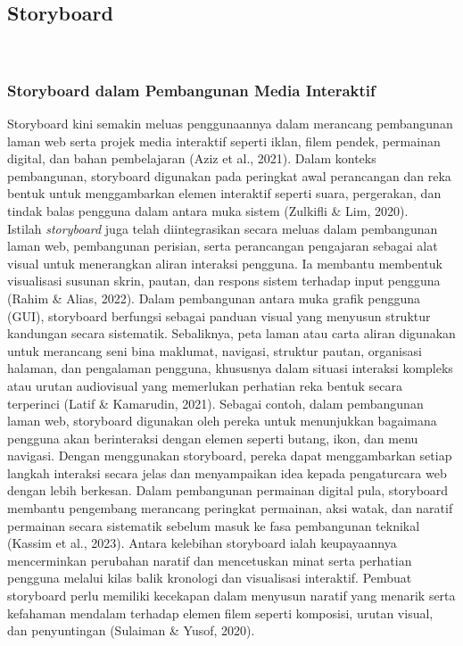 \subsection{Storyboard }\\

\subsubsection{{Storyboard dalam Pembangunan Media Interaktif}}Storyboard kini semakin meluas penggunaannya dalam merancang pembangunan laman web serta projek media interaktif seperti iklan, filem pendek, permainan digital, dan bahan pembelajaran (Aziz et al., 2021). Dalam konteks pembangunan, storyboard digunakan pada peringkat awal perancangan dan reka bentuk untuk menggambarkan elemen interaktif seperti suara, pergerakan, dan tindak balas pengguna dalam antara muka sistem (Zulkifli \& Lim, 2020).\\Istilah \textit{storyboard} juga telah diintegrasikan secara meluas dalam pembangunan laman web, pembangunan perisian, serta perancangan pengajaran sebagai alat visual untuk menerangkan aliran interaksi pengguna. Ia membantu membentuk visualisasi susunan skrin, pautan, dan respons sistem terhadap input pengguna (Rahim \& Alias, 2022). Dalam pembangunan antara muka grafik pengguna (GUI), storyboard berfungsi sebagai panduan visual yang menyusun struktur kandungan secara sistematik. Sebaliknya, peta laman atau carta aliran digunakan untuk merancang seni bina maklumat, navigasi, struktur pautan, organisasi halaman, dan pengalaman pengguna, khususnya dalam situasi interaksi kompleks atau urutan audiovisual yang memerlukan perhatian reka bentuk secara terperinci (Latif \& Kamarudin, 2021). Sebagai contoh, dalam pembangunan laman web, storyboard digunakan oleh pereka untuk menunjukkan bagaimana pengguna akan berinteraksi dengan elemen seperti butang, ikon, dan menu navigasi. Dengan menggunakan storyboard, pereka dapat menggambarkan setiap langkah interaksi secara jelas dan menyampaikan idea kepada pengaturcara web dengan lebih berkesan. Dalam pembangunan permainan digital pula, storyboard membantu pengembang merancang peringkat permainan, aksi watak, dan naratif permainan secara sistematik sebelum masuk ke fasa pembangunan teknikal (Kassim et al., 2023). Antara kelebihan storyboard ialah keupayaannya mencerminkan perubahan naratif dan mencetuskan minat serta perhatian pengguna melalui kilas balik kronologi dan visualisasi interaktif. Pembuat storyboard perlu memiliki kecekapan dalam menyusun naratif yang menarik serta kefahaman mendalam terhadap elemen filem seperti komposisi, urutan visual, dan penyuntingan (Sulaiman \& Yusof, 2020).
\clearpage

